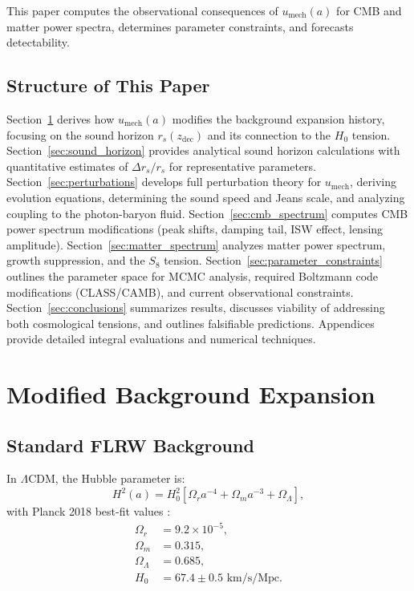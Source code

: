 \documentclass[11pt,a4paper]{article}
\newcommand{\umech}{\ensuremath{u_{\mathrm{mech}}}}
\newcommand{\zdec}{\ensuremath{z_{\mathrm{dec}}}}
\newcommand{\rs}{\ensuremath{r_s}}
\newcommand{\Omm}{\ensuremath{\Omega_m}}
\newcommand{\Omr}{\ensuremath{\Omega_r}}
\newcommand{\OmL}{\ensuremath{\Omega_\Lambda}}
\theoremstyle{definition}
\theoremstyle{remark}
\begin{document}
This paper computes the observational consequences of $\umech(a)$ for CMB and matter power spectra, determines parameter constraints, and forecasts detectability.

\subsection{Structure of This Paper}
\label{sec:structure}

Section~\ref{sec:background} derives how $\umech(a)$ modifies the background expansion history, focusing on the sound horizon $\rs(\zdec)$ and its connection to the $H_0$ tension. Section~\ref{sec:sound_horizon} provides analytical sound horizon calculations with quantitative estimates of $\Delta\rs/\rs$ for representative parameters. Section~\ref{sec:perturbations} develops full perturbation theory for $\umech$, deriving evolution equations, determining the sound speed and Jeans scale, and analyzing coupling to the photon-baryon fluid. Section~\ref{sec:cmb_spectrum} computes CMB power spectrum modifications (peak shifts, damping tail, ISW effect, lensing amplitude). Section~\ref{sec:matter_spectrum} analyzes matter power spectrum, growth suppression, and the $S_8$ tension. Section~\ref{sec:parameter_constraints} outlines the parameter space for MCMC analysis, required Boltzmann code modifications (CLASS/CAMB), and current observational constraints. Section~\ref{sec:conclusions} summarizes results, discusses viability of addressing both cosmological tensions, and outlines falsifiable predictions. Appendices provide detailed integral evaluations and numerical techniques.

\section{Modified Background Expansion}
\label{sec:background}

\subsection{Standard FLRW Background}
\label{sec:standard_background}

In $\Lambda$CDM, the Hubble parameter is:
\begin{equation}
H^2(a) = H_0^2 \left[ \Omr a^{-4} + \Omm a^{-3} + \OmL \right],
\end{equation}
with Planck 2018 best-fit values \cite{Planck2018}:
\begin{align}
\Omr &= 9.2 \times 10^{-5}, \\
\Omm &= 0.315, \\
\OmL &= 0.685, \\
H_0 &= 67.4 \pm 0.5 \text{ km/s/Mpc}.
\end{align}
\end{document}
